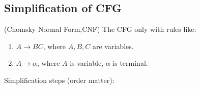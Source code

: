 
\usepackage{../../lectures_preamble}


    \subsection{Simplification of CFG}
    \begin{definition}
        (Chomsky Normal Form,CNF) The CFG only with rules like:
        \begin{enumerate}
            \item $A\rightarrow BC$, where $A,B,C$ are variables.
            \item $A\rightarrow \alpha$, where $A$ is variable, $\alpha$ is terminal.
        \end{enumerate}
    \end{definition}
    Simplification steps (order matter):
